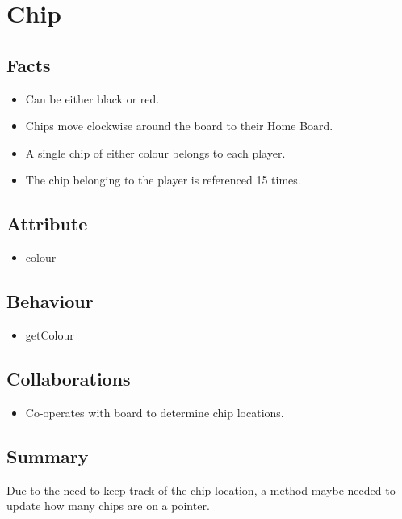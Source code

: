 \section{Chip}

\subsection{Facts}
\begin{itemize} [itemsep=2pt,parsep=2pt]
    \item Can be either black or red.
    \item Chips move clockwise around the board to their Home Board.
    \item A single chip of either colour belongs to each player.
    \item The chip belonging to the player is referenced 15 times.
\end{itemize}


\subsection{Attribute}
\begin{itemize} [itemsep=2pt,parsep=2pt]
    \item colour
\end{itemize}

\subsection{Behaviour}
\begin{itemize} [itemsep=2pt,parsep=2pt]
    \item getColour
\end{itemize}

\subsection{Collaborations}
\begin{itemize} [itemsep=2pt,parsep=2pt]
    \item Co-operates with board to determine chip locations.
\end{itemize}

\subsection{Summary}
Due to the need to keep track of the chip location, a method maybe needed to update how many chips
are on a pointer.

